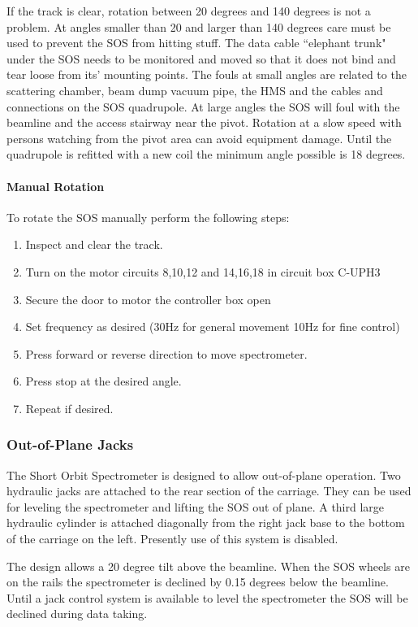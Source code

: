 If the track is clear, rotation between 20 degrees and 140 degrees is not a
problem. At angles smaller than 20 and larger than 140 degrees care must
be used to prevent the SOS from hitting stuff. The data cable ``elephant
trunk" under the SOS needs to be monitored and moved so that it does not
bind and tear loose from its' mounting points. The fouls at small angles are
related to the scattering chamber, beam dump vacuum pipe, the HMS and
the cables and connections on the SOS quadrupole. At large angles the
SOS will foul with the beamline and the access stairway near the pivot.
Rotation at a slow speed with persons watching from the pivot area can
avoid equipment damage. Until the quadrupole is refitted with a new coil
the minimum angle possible is 18 degrees.

\paragraph{Manual Rotation}

To rotate the SOS manually perform the following steps:

\begin{enumerate}
\item{Inspect and clear the track.}
\item{Turn on the motor circuits 8,10,12 and 14,16,18 in circuit box C-UPH3}
\item{Secure the door to motor the controller box open}
\item{Set frequency as desired (30Hz for general movement 10Hz for fine
control)}
\item{Press forward or reverse direction to move spectrometer.}
\item{Press stop at the desired angle.}
\item{Repeat if desired.}
\end{enumerate}




\subsubsection{Out-of-Plane Jacks}

The Short Orbit Spectrometer is designed to allow out-of-plane operation.
Two hydraulic jacks are attached to the rear section of the carriage. They
can be used for leveling the spectrometer and lifting the SOS out of plane. A
third large hydraulic cylinder is attached diagonally from the right jack
base to the bottom of the carriage on the left.  Presently use of
this system is disabled.

The design allows a 20 degree tilt above the beamline. When the SOS
wheels are on the rails the spectrometer is declined by 0.15 degrees below
the beamline. Until a jack control system is available to level the
spectrometer the SOS will be declined during data taking.
